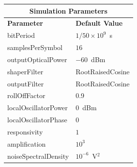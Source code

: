 \begin{refsection}
\begin{table}[H]
	\centering
	\footnotesize
	\begin{tabular}{|l|l|}
		\hline
		\multicolumn{2}{|c|}{ \textbf{Simulation Parameters} } \\
		\hline
		\textbf{Parameter}     & \textbf{Default Value}                                     \\\hline
		bitPeriod              & $1/50\times10^9$~s														\\\hline
		samplesPerSymbol       & $16$                                                       \\\hline
		outputOpticalPower     & $-60$~dBm 													\\ \hline
		shaperFilter	       & RootRaisedCosine												\\ \hline
		outputFilter		   & RootRaisedCosine												\\ \hline
		rollOffFactor		   & 0.9														\\ \hline
		localOscillatorPower   & $0$~dBm                                                    \\ \hline
		localOscillatorPhase   & $0$                                                        \\ \hline
		responsivity           & $1$                                                        \\ \hline
		amplification          & $10^3$                                                     \\ \hline
		noiseSpectralDensity   & $10^{-6}$~V$^2$                             					\\ \hline

\end{tabular}
\end{table}
\end{refsection}

